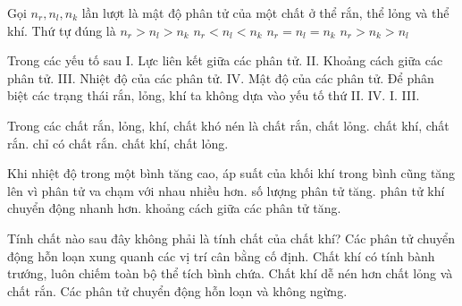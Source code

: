 \begin{ex}
Gọi $n_r, n_l, n_k$ lần lượt là mật độ phân tử của một chất ở thể rắn, thể lỏng và thể khí. Thứ tự đúng là
\choice
{\True $n_r > n_l > n_k$}
{$n_r < n_l < n_k$}
{$n_r = n_l = n_k$}
{$n_r > n_k > n_l$}
\end{ex}

\begin{ex}
Trong các yếu tố sau
I. Lực liên kết giữa các phân tử.
II. Khoảng cách giữa các phân tử.
III. Nhiệt độ của các phân tử.
IV. Mật độ của các phân tử.
Để phân biệt các trạng thái rắn, lỏng, khí ta không dựa vào yếu tố thứ
\choice
{II.}
{IV.}
{I.}
{\True III.}
\end{ex}

\begin{ex}
Trong các chất rắn, lỏng, khí, chất khó nén là
\choice
{\True chất rắn, chất lỏng.}
{chất khí, chất rắn.}
{chỉ có chất rắn.}
{chất khí, chất lỏng.}
\end{ex}


\begin{ex}
Khi nhiệt độ trong một bình tăng cao, áp suất của khối khí trong bình cũng tăng lên vì
\choice
{phân tử va chạm với nhau nhiều hơn.}
{số lượng phân tử tăng.}
{\True phân tử khí chuyển động nhanh hơn.}
{khoảng cách giữa các phân tử tăng.}
\end{ex}


\begin{ex}
Tính chất nào sau đây không phải là tính chất của chất khí?
\choice
{\True Các phân tử chuyển động hỗn loạn xung quanh các vị trí cân bằng cố định.}
{Chất khí có tính bành trướng, luôn chiếm toàn bộ thể tích bình chứa.}
{Chất khí dễ nén hơn chất lỏng và chất rắn.}
{Các phân tử chuyển động hỗn loạn và không ngừng.}
\end{ex}

